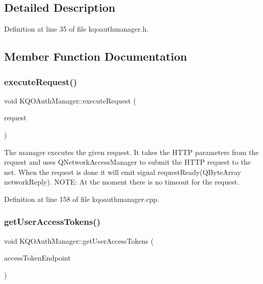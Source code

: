 \subsection{Detailed Description}


Definition at line 35 of file kqoauthmanager.\+h.



\subsection{Member Function Documentation}
\mbox{\label{class_k_q_o_auth_manager_a7ed4ddfccc440383f72215cff7cb37ef}} 
\subsubsection{\texorpdfstring{execute\+Request()}{executeRequest()}}
{\footnotesize\ttfamily void K\+Q\+O\+Auth\+Manager\+::execute\+Request (\begin{DoxyParamCaption}\item[{\hyperlink{class_k_q_o_auth_request}{K\+Q\+O\+Auth\+Request} $\ast$}]{request }\end{DoxyParamCaption})}

The manager executes the given request. It takes the H\+T\+TP parameters from the request and uses Q\+Network\+Access\+Manager to submit the H\+T\+TP request to the net. When the request is done it will emit signal request\+Ready(\+Q\+Byte\+Array network\+Reply). N\+O\+TE\+: At the moment there is no timeout for the request. 

Definition at line 158 of file kqoauthmanager.\+cpp.

\mbox{\label{class_k_q_o_auth_manager_a657d5a05c680ed6c53199e9de59f2e1c}} 
\subsubsection{\texorpdfstring{get\+User\+Access\+Tokens()}{getUserAccessTokens()}}
{\footnotesize\ttfamily void K\+Q\+O\+Auth\+Manager\+::get\+User\+Access\+Tokens (\begin{DoxyParamCaption}\item[{Q\+Url}]{access\+Token\+Endpoint }\end{DoxyParamCaption})}

